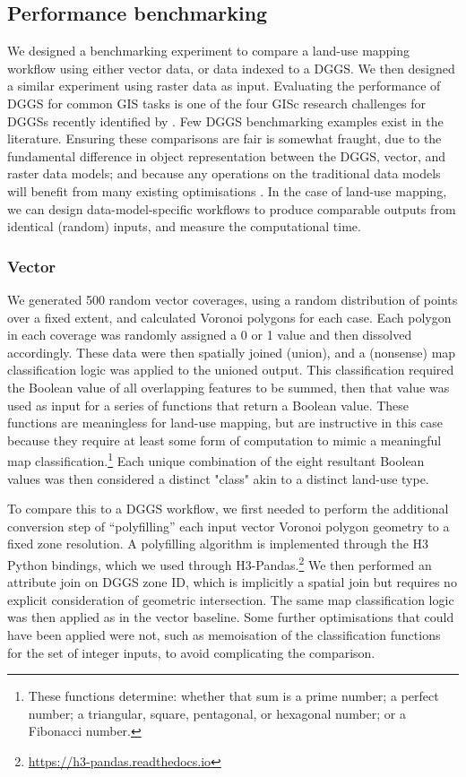 \documentclass[]{interact}
\theoremstyle{plain}%
\theoremstyle{definition}
\theoremstyle{remark}
\begin{document}
\subsection{Performance benchmarking}

We designed a benchmarking experiment to compare a land-use mapping workflow using either vector data, or data indexed to a \ac{DGGS}. We then designed a similar experiment using raster data as input. Evaluating the performance of \ac{DGGS} for common \ac{GIS} tasks is one of the four \ac{GISc} research challenges for \acp{DGGS} recently identified by \citet{hojati2022giscience}. Few \ac{DGGS} benchmarking examples exist in the literature. Ensuring these comparisons are fair is somewhat fraught, due to the fundamental difference in object representation between the DGGS, vector, and raster data models; and because any operations on the traditional data models will benefit from many existing optimisations \citep{hojati2022giscience}. In the case of land-use mapping, we can design data-model-specific workflows to produce comparable outputs from identical (random) inputs, and measure the computational time.

\subsubsection{Vector}

We generated 500 random vector coverages, using a random distribution of points over a fixed extent, and calculated Voronoi polygons for each case. Each polygon in each coverage was randomly assigned a 0 or 1 value and then dissolved accordingly. These data were then spatially joined (union), and a (nonsense) map classification logic was applied to the unioned output. This classification required the Boolean value of all overlapping features to be summed, then that value was used as input for a series of functions that return a Boolean value. These functions are meaningless for land-use mapping, but are instructive in this case because they require at least some form of computation to mimic a meaningful map classification.\footnote{These functions determine: whether that sum is a prime number; a perfect number; a triangular, square, pentagonal, or hexagonal number; or a Fibonacci number.} Each unique combination of the eight resultant Boolean values was then considered a distinct "class" akin to a distinct land-use type.

To compare this to a \ac{DGGS} workflow, we first needed to perform the additional conversion step of ``polyfilling'' each input vector Voronoi polygon geometry to a fixed zone resolution. A polyfilling algorithm is implemented through the H3 Python bindings, which we used through H3-Pandas.\footnote{\url{https://h3-pandas.readthedocs.io}} We then performed an attribute join on \ac{DGGS} zone ID, which is implicitly a spatial join but requires no explicit consideration of geometric intersection. The same map classification logic was then applied as in the vector baseline. Some further optimisations that could have been applied were not, such as memoisation of the classification functions for the set of integer inputs, to avoid complicating the comparison.
\end{document}
